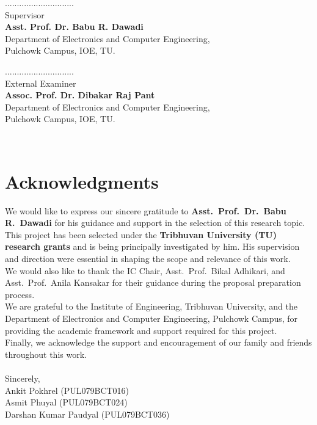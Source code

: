\documentclass[12pt]{report}
\begin{document}
\vspace{1cm}
\begin{minipage}{.5\textwidth}
    \raggedright
    .............................\\
    Supervisor\\
    \textbf{Asst. Prof. Dr. Babu R. Dawadi}\\
    Department of Electronics and Computer Engineering,\\
    Pulchowk Campus, IOE, TU.\\
\end{minipage}%
\begin{minipage}{0.5\textwidth}
    \raggedleft
    .............................\\
    External Examiner\\
    \textbf{Assoc. Prof. Dr. Dibakar Raj Pant}\\
    Department of Electronics and Computer Engineering,\\
    Pulchowk Campus, IOE, TU.\\
\end{minipage}\\
\newline
\newline
\newline


\chapter*{Acknowledgments}

We would like to express our sincere gratitude to \textbf{Asst.\ Prof.\ Dr.\ Babu R.\ Dawadi} for his guidance and support in the selection of this research topic. This project has been selected under the \textbf{Tribhuvan University (TU) research grants} and is being principally investigated by him. His supervision and direction were essential in shaping the scope and relevance of this work.\\
We would also like to thank the IC Chair, Asst.\ Prof.\ Bikal Adhikari, and Asst.\ Prof.\ Anila Kansakar for their guidance during the proposal preparation process.\\
We are grateful to the Institute of Engineering, Tribhuvan University, and the Department of Electronics and Computer Engineering, Pulchowk Campus, for providing the academic framework and support required for this project.\\
Finally, we acknowledge the support and encouragement of our family and friends throughout this work.\\
\\
Sincerely,\\
Ankit Pokhrel (PUL079BCT016)\\
Asmit Phuyal (PUL079BCT024)\\
Darshan Kumar Paudyal (PUL079BCT036)\\
\end{document}
